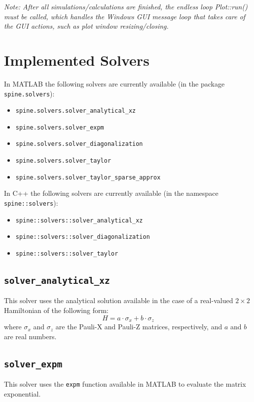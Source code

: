 \documentclass[10pt,a4paper,onecolumn,notitlepage]{article}
\begin{document}
\emph{Note: After all simulations/calculations are finished, the endless loop Plot::run() must be called, which handles the Windows GUI message loop that takes care of the GUI actions, such as plot window resizing/closing.}

\section{Implemented Solvers}
\label{sec:solvers}

In MATLAB the following solvers are currently available (in the package \lstinline{spine.solvers}):
\begin{itemize}
	\item \lstinline{spine.solvers.solver_analytical_xz}
	\item \lstinline{spine.solvers.solver_expm}
	\item \lstinline{spine.solvers.solver_diagonalization}
	\item \lstinline{spine.solvers.solver_taylor}
	\item \lstinline{spine.solvers.solver_taylor_sparse_approx}
\end{itemize}
In C++ the following solvers are currently available (in the namespace \lstinline{spine::solvers}):
\begin{itemize}
	\item \lstinline{spine::solvers::solver_analytical_xz}
	\item \lstinline{spine::solvers::solver_diagonalization}
	\item \lstinline{spine::solvers::solver_taylor}
\end{itemize}

\subsection{\lstinline{solver_analytical_xz}}
This solver uses the analytical solution available in the case of a real-valued $2\times2$ Hamiltonian of the following form:
\begin{equation}
	H = a \cdot \sigma_x + b \cdot \sigma_z
\end{equation}
where $\sigma_x$ and $\sigma_z$ are the Pauli-X and Pauli-Z matrices, respectively, and $a$ and $b$ are real numbers.

\subsection{\lstinline{solver_expm}}
This solver uses the \lstinline{expm} function available in MATLAB to evaluate the matrix exponential.
\end{document}
